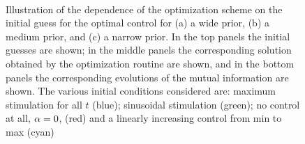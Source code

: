 \begin{figure}[h]
\begin{center}
\\
\caption[Dependence on initial guess for control]{Illustration of the dependence
of the optimization scheme on the initial guess for the optimal
control for (a) a wide prior, (b) a medium prior, and (c) a narrow prior. 
In the top panels the initial guesses are shown; in the middle
panels the corresponding solution obtained by the optimization routine
are shown, and
in the bottom panels the corresponding evolutions of the mutual
information are shown.
The various initial conditions considered are: maximum stimulation for all $t$
(blue); sinusoidal stimulation (green); no control at all, $\alpha=0$, (red) and a
linearly increasing control from min to max (cyan)}
\label{fig:ICs_for_control}
\end{center}
\end{figure}

